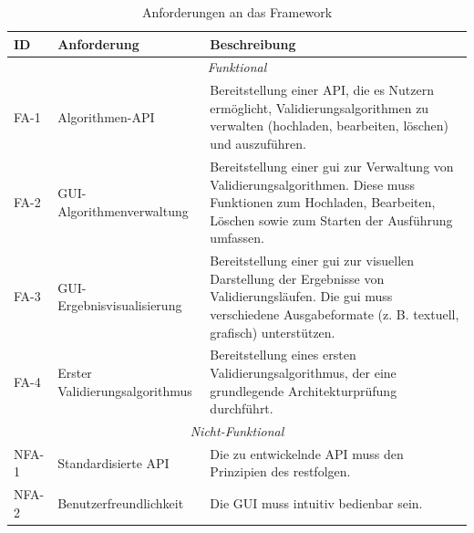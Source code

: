 \begin{table}[h!]
  \centering
  \footnotesize
  \begin{tabularx}{\textwidth}{l l X}
    \toprule
    \textbf{ID} & \textbf{Anforderung}           & \textbf{Beschreibung}                                                                                                                                                                   \\
    \midrule
    \multicolumn{3}{c}{\textit{Funktional}}                                                                                                                                                                                                \\
    \midrule
    FA-1        & Algorithmen-API                & Bereitstellung einer API, die es Nutzern ermöglicht, Validierungsalgorithmen zu verwalten (hochladen, bearbeiten, löschen) und auszuführen.                                             \\
    \midrule
    FA-2        & GUI-Algorithmenverwaltung      & Bereitstellung einer \gls{gui} zur Verwaltung von Validierungsalgorithmen. Diese muss Funktionen zum Hochladen, Bearbeiten, Löschen sowie zum Starten der Ausführung umfassen.          \\
    \midrule
    FA-3        & GUI-Ergebnisvisualisierung     & Bereitstellung einer \gls{gui} zur visuellen Darstellung der Ergebnisse von Validierungsläufen. Die \gls{gui} muss verschiedene Ausgabeformate (z. B. textuell, grafisch) unterstützen. \\
    \midrule
    FA-4        & Erster Validierungsalgorithmus & Bereitstellung eines ersten Validierungsalgorithmus, der eine grundlegende Architekturprüfung durchführt.                                                                               \\
    \bottomrule
    \multicolumn{3}{c}{\textit{Nicht-Funktional}}                                                                                                                                                                                          \\
    \midrule
    NFA-1       & Standardisierte API            & Die zu entwickelnde API muss den Prinzipien des \gls{rest}folgen.                                                                                                                       \\
    \midrule
    NFA-2       & Benutzerfreundlichkeit         & Die GUI muss intuitiv bedienbar sein.                                                                                                                                                   \\
    \bottomrule
  \end{tabularx}
  \caption{Anforderungen an das Framework}
  \label{tab:anforderungen}
\end{table}


